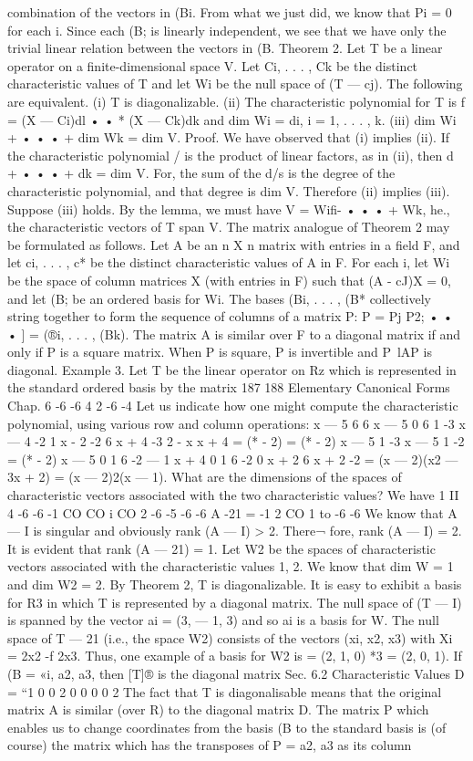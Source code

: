 combination of the vectors in (Bi. From what we just did, we know that Pi = 0 for each i. Since each (B; is linearly independent, we see that we have only the trivial linear relation between the vectors in (B. Theorem 2. Let T be a linear operator on a finite-dimensional space V. Let Ci, . . . , Ck be the distinct characteristic values of T and let Wi be the null space of (T — cj). The following are equivalent. (i) T is diagonalizable. (ii) The characteristic polynomial for T is f = (X — Ci)dl • • * (X — Ck)dk and dim Wi = di, i = 1, . . . , k. (iii) dim Wi + • • • + dim Wk = dim V. Proof. We have observed that (i) implies (ii). If the characteristic polynomial / is the product of linear factors, as in (ii), then d + • • • + dk = dim V. For, the sum of the d/s is the degree of the characteristic polynomial, and that degree is dim V. Therefore (ii) implies (iii). Suppose (iii) holds. By the lemma, we must have V = Wifi- • • • + Wk, he., the characteristic vectors of T span V. The matrix analogue of Theorem 2 may be formulated as follows. Let A be an n X n matrix with entries in a field F, and let ci, . . . , c* be the distinct characteristic values of A in F. For each i, let Wi be the space of column matrices X (with entries in F) such that (A - cJ)X = 0, and let (B; be an ordered basis for Wi. The bases (Bi, . . . , (B* collectively string together to form the sequence of columns of a matrix P: P = Pj P2; • • • ] = (®i, . . . , (Bk). The matrix A is similar over F to a diagonal matrix if and only if P is a square matrix. When P is square, P is invertible and P~lAP is diagonal. Example 3. Let T be the linear operator on Rz which is represented in the standard ordered basis by the matrix 187 188 Elementary Canonical Forms Chap. 6 -6 -6 4 2 -6 -4 Let us indicate how one might compute the characteristic polynomial, using various row and column operations: x — 5 6 6 x — 5 0 6 1 -3 x — 4 -2  1 x - 2 -2 6 x + 4 -3 2 - x x + 4 = (* - 2) = (* - 2) x — 5 1 -3 x — 5 1 -2 = (* - 2) x — 5 0 1 6 -2 — 1 x + 4 0 1 6 -2 0 x + 2 6 x + 2 -2 = (x — 2)(x2 — 3x + 2) = (x — 2)2(x — 1). What are the dimensions of the spaces of characteristic vectors associated with the two characteristic values? We have 1 II 4 -6 -6 -1 CO CO i CO 2 -6 -5 -6 -6 A -21 = -1 2 CO 1 to -6 -6 We know that A — I is singular and obviously rank (A — I) > 2. There¬ fore, rank (A — I) = 2. It is evident that rank (A — 21) = 1. Let W2 be the spaces of characteristic vectors associated with the characteristic values 1, 2. We know that dim W = 1 and dim W2 = 2. By Theorem 2, T is diagonalizable. It is easy to exhibit a basis for R3 in which T is represented by a diagonal matrix. The null space of (T — I) is spanned by the vector ai = (3, — 1, 3) and so ai is a basis for W. The null space of T — 21 (i.e., the space W2) consists of the vectors (xi, x2, x3) with Xi = 2x2 -f 2x3. Thus, one example of a basis for W2 is = (2, 1, 0) *3 = (2, 0, 1). If (B = «i, a2, a3, then [T]® is the diagonal matrix Sec. 6.2 Characteristic Values D = “1 0 0 2 0 0 0 0 2 The fact that T is diagonalisable means that the original matrix A is similar (over R) to the diagonal matrix D. The matrix P which enables us to change coordinates from the basis (B to the standard basis is (of course) the matrix which has the transposes of P = a2, a3 as its column 
